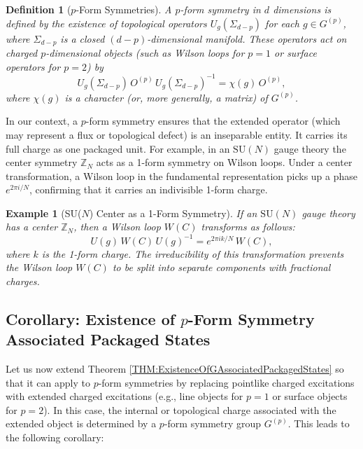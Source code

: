 \documentclass[12pt,a4paper]{article}
\newtheorem{definition}{Definition}
\newtheorem{example}{Example}
\begin{document}
\begin{definition}[$p$-Form Symmetries]
	A $p$-form symmetry in $d$ dimensions is defined by the existence of topological operators $U_g(\Sigma_{d-p})$ for each $g\in G^{(p)}$, where $\Sigma_{d-p}$ is a closed $(d-p)$-dimensional manifold.
	These operators act on charged $p$-dimensional objects (such as Wilson loops for $p=1$ or surface operators for $p=2$) by
	\[
	U_g(\Sigma_{d-p})\, O^{(p)}\, U_g(\Sigma_{d-p})^{-1} = \chi(g)\, O^{(p)},
	\]
	where $\chi(g)$ is a character (or, more generally, a matrix) of $G^{(p)}$.
\end{definition}

In our context, a $p$-form symmetry ensures that the extended operator (which may represent a flux or topological defect) is an inseparable entity.
It carries its full charge as one packaged unit.
For example, in an $\mathrm{SU}(N)$ gauge theory the center symmetry $\mathbb{Z}_N$ acts as a 1-form symmetry on Wilson loops.
Under a center transformation, a Wilson loop in the fundamental representation picks up a phase $e^{2\pi i/N}$, confirming that it carries an indivisible 1-form charge.

\begin{example}[SU($N$) Center as a 1-Form Symmetry]
	If an $\mathrm{SU}(N)$ gauge theory has a center $\mathbb{Z}_N$, then a Wilson loop $W(C)$ transforms as follows:
	\[
	U(g)\, W(C)\, U(g)^{-1} = e^{2\pi i k/N}\, W(C),
	\]
	where $k$ is the 1-form charge.
	The irreducibility of this transformation prevents the Wilson loop $W(C)$ to be split into separate components with fractional charges.
\end{example}


\subsection{Corollary: Existence of $p$-Form Symmetry Associated Packaged States}

Let us now extend Theorem \ref{THM:ExistenceOfGAssociatedPackagedStates} so that it can apply to $p$-form symmetries by replacing pointlike charged excitations with extended charged excitations (e.g., line objects for $p=1$ or surface objects for $p=2$).
In this case, the internal or topological charge associated with the extended object is determined by a $p$-form symmetry group $G^{(p)}$.
This leads to the following corollary:
\end{document}
